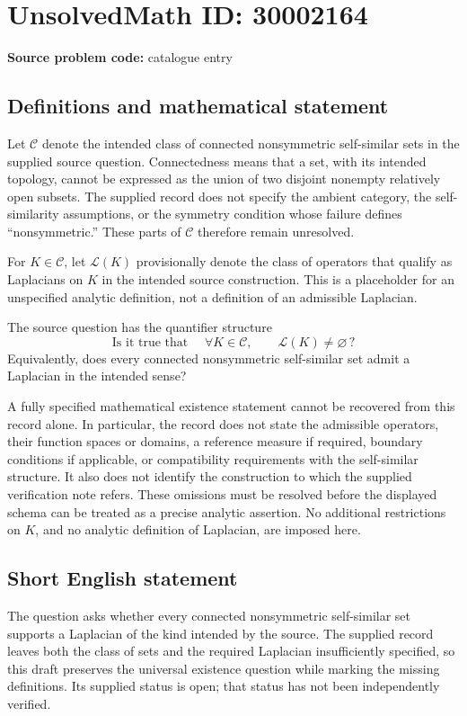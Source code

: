 \documentclass[11pt]{article}
\begin{document}
\section*{UnsolvedMath ID: 30002164}
\textbf{Source problem code:} catalogue entry
\subsection{Definitions and mathematical statement}
Let \(\mathscr C\) denote the intended class of connected nonsymmetric self-similar sets in the supplied source question. Connectedness means that a set, with its intended topology, cannot be expressed as the union of two disjoint nonempty relatively open subsets. The supplied record does not specify the ambient category, the self-similarity assumptions, or the symmetry condition whose failure defines ``nonsymmetric.'' These parts of \(\mathscr C\) therefore remain unresolved.

For \(K\in\mathscr C\), let \(\mathscr L(K)\) provisionally denote the class of operators that qualify as Laplacians on \(K\) in the intended source construction. This is a placeholder for an unspecified analytic definition, not a definition of an admissible Laplacian.

The source question has the quantifier structure
\[
\text{Is it true that }\quad
\forall K\in\mathscr C,\qquad \mathscr L(K)\ne\varnothing\,?
\]
Equivalently, does every connected nonsymmetric self-similar set admit a Laplacian in the intended sense?

A fully specified mathematical existence statement cannot be recovered from this record alone. In particular, the record does not state the admissible operators, their function spaces or domains, a reference measure if required, boundary conditions if applicable, or compatibility requirements with the self-similar structure. It also does not identify the construction to which the supplied verification note refers. These omissions must be resolved before the displayed schema can be treated as a precise analytic assertion. No additional restrictions on \(K\), and no analytic definition of Laplacian, are imposed here.
\subsection{Short English statement}
The question asks whether every connected nonsymmetric self-similar set supports a Laplacian of the kind intended by the source. The supplied record leaves both the class of sets and the required Laplacian insufficiently specified, so this draft preserves the universal existence question while marking the missing definitions. Its supplied status is open; that status has not been independently verified.
\end{document}
